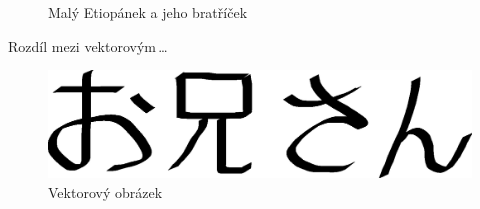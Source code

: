 \documentclass[a4paper,11pt,draft]{article}
\begin{document}
\begin{figure}[h]
	\caption{Malý Etiopánek a jeho bratříček}
	\label{etiop}
\end{figure}

\newpage

Rozdíl mezi vektorovým\,\ldots

\begin{figure}[h]
	\centering
	\includegraphics[scale=0.4]{oniisan}
	\caption{Vektorový obrázek}
	\label{vect}
\end{figure}
\end{document}

